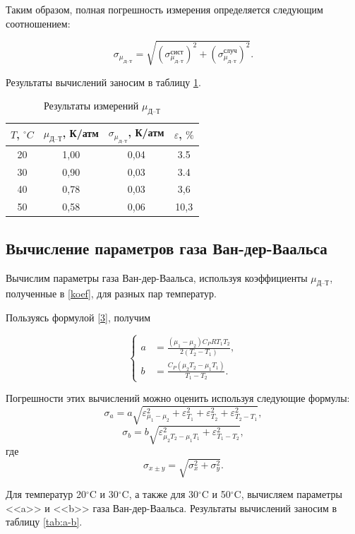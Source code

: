\documentclass[a4paper,12pt]{article} %
\begin{document}
Таким образом, полная погрешность измерения определяется следующим соотношением:

\[ \sigma_{\mu_\text{Д--Т}} = \sqrt{(\sigma_{\mu_\text{Д--Т}}^\text{сист})^2 + (\sigma_{\mu_\text{Д--Т}}^\text{случ})^2}.\]

Результаты вычислений заносим в таблицу \ref{tab:my-table}.
\label{koef}
\begin{table}[H]
	\centering
	\begin{tabular}{|c|c|c|c|}
		\hline
		$ T $, $ ^\circ C $ & $ \mu_\text{Д--Т} $, К/атм & $ \sigma_{\mu_\text{Д--Т}} $, К/атм & $ \varepsilon $, $ \% $ \\ \hline
		20 & 1,00 & 0,04 & 3.5 \\ \hline
		30 & 0,90 & 0,03 & 3.4 \\ \hline
            40 & 0,78 & 0,03 & 3,6 \\ \hline
		50 & 0,58 & 0,06 & 10,3 \\ \hline
	\end{tabular}
	\caption{Результаты измерений $ \mu_\text{Д--Т} $}
	\label{tab:my-table}
\end{table}

\subsection*{Вычисление параметров газа Ван-дер-Ваальса}

Вычислим параметры газа Ван-дер-Ваальса, используя коэффициенты $ \mu_\text{Д--Т} $, полученные в \ref{koef}, для разных пар температур.

Пользуясь формулой \eqref{3}, получим 

\[ \left\{ \begin{aligned}
	 a &= \frac{\left(\mu_1 - \mu_2\right)C_PRT_1T_2}{2\left(T_2-T_1\right)}, \\
	b &= \frac{C_P(\mu_2T_2-\mu_1T_1)}{T_1-T_2}. \end{aligned} \right. \]

Погрешности этих вычислений можно оценить используя следующие формулы:~\[ \sigma_a = a\sqrt{\varepsilon^2_{\mu_1-\mu_2}+\varepsilon^2_{T_1}+\varepsilon^2_{T_2}+\varepsilon^2_{T_2-T_1}}, \] \[ \sigma_b=b\sqrt{\varepsilon^2_{\mu_2T_2-\mu_1T_1}+\varepsilon^2_{T_1-T_2}}, \] где \[ \sigma_{x\pm y} =\sqrt{\sigma^2_x+\sigma^2_y}. \]

Для температур 20$ ^\circ $C и 30$ ^\circ $C, а также для 30$ ^\circ $C и 50$ ^\circ $C, вычисляем параметры <<a>> и <<b>> газа Ван-дер-Ваальса. Результаты вычислений заносим в таблицу \ref{tab:a-b}.
\end{document}
